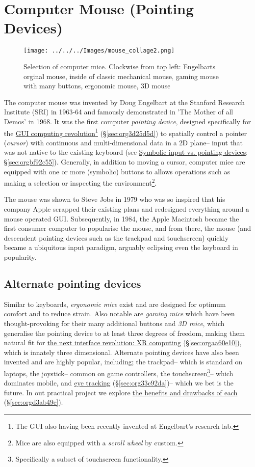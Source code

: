 \documentclass[logo,bsc,singlespacing,parskip]{infthesis}
\begin{document}
\chapter{Computer Mouse (Pointing Devices)}
\label{sec:org60a15dc}
\begin{figure}[h]
\centering
\texttt{[image: ../../../Images/mouse\_collage2.png]}
\caption[Computer mouse collage]{Selection of computer mice. Clockwise from top left: Engelbarts orginal mouse, inside of classic mechanical mouse, gaming mouse with many buttons, ergonomic mouse, 3D mouse}
\end{figure}
The computer mouse was invented by Doug Engelbart at the Stanford Research Institute (SRI) in 1963-64 and famously demonstrated in 'The Mother of all Demos' in 1968.
It was the first computer \emph{pointing device}, designed specifically for the \hyperref[sec:org3d25d5d]{GUI computing revolution}\footnote{The GUI also having been recently invented at Engelbart's research lab.} (\S \ref{sec:org3d25d5d}) to spatially control a pointer (\emph{cursor}) with continuous and multi-dimensional data in a 2D plane-- input that was not native to the existing keyboard (see \hyperref[sec:orgbf92c55]{Symbolic input vs. pointing  devices}; \S \ref{sec:orgbf92c55}).
Generally, in addition to moving a cursor, computer mice are equipped with one or more (symbolic) buttons to allows operations such as making a selection or inspecting the environment\footnote{Mice are also equipped with a \emph{scroll wheel} by custom.}.

The mouse was shown to Steve Jobs in 1979 who was so inspired that his company Apple scrapped their existing plans and redesigned everything around a mouse operated GUI.
Subsequently, in 1984, the Apple Macintosh became the first consumer computer to popularise the mouse, and from there, the mouse (and descendent pointing devices such as the trackpad and touchscreen) quickly became a ubiquitous input paradigm, arguably eclipsing even the keyboard in popularity.

\section{Alternate pointing devices}
\label{sec:org7af84b8}
Similar to keyboards, \emph{ergonomic mice} exist and are designed for optimum comfort and to reduce strain.
Also notable are \emph{gaming mice} which have been thought-provoking for their many additional buttons and \emph{3D mice}, which generalise the pointing device to at least three degrees of freedom, making them natural fit for \hyperref[sec:orgaa60e10]{the next interface revolution: XR computing} (\S  \ref{sec:orgaa60e10}), which is innately three dimensional.
Alternate pointing devices have also been invented and are highly popular, including; the trackpad-- which is standard on laptops, the joystick-- common on game controllers, the touchscreen\footnote{Specifically a subset of touchscreen functionality.}-- which dominates mobile, and \hyperref[sec:org33c92da]{eye tracking} (\S \ref{sec:org33c92da})-- which we bet is the future.
In out practical project we explore \hyperref[sec:orgd3ab49c]{the benefits and drawbacks of each} (\S \ref{sec:orgd3ab49c}).
\end{document}
